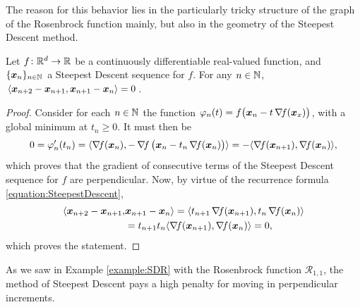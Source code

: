 \begin{example}
\begin{itemize}[nosep]
\end{itemize}
The reason for this behavior lies in the particularly tricky structure of the graph of the Rosenbrock function mainly, but also in the geometry of the Steepest Descent method.
\end{example}

\begin{theorem}
Let $f \colon \mathbb{R}^d \to \mathbb{R}$ be a continuously differentiable real-valued function, and $\{ \boldsymbol{x}_n \}_{n\in\mathbb{N}}$ a Steepest Descent sequence for $f$.  For any $n \in \mathbb{N}$, $\langle \boldsymbol{x}_{n+2} - \boldsymbol{x}_{n+1}, \boldsymbol{x}_{n+1} - \boldsymbol{x}_n \rangle = 0$.
\end{theorem}
\begin{proof}
Consider for each $n \in \mathbb{N}$ the function $\varphi_n(t) = f\big(\boldsymbol{x}_n -t \mathop{\nabla\! {f}}(\boldsymbol{x}_x)\big)$, with a global minimum at $t_n \geq 0$.  It must then be
\begin{equation*}
0 = \varphi_n'(t_n) = \langle \mathop{\nabla\! {f}}(\boldsymbol{x}_n), -\mathop{\nabla\! {f}}\big( \boldsymbol{x}_n - t_n \mathop{\nabla\! {f}}(\boldsymbol{x}_n)\big) \rangle = - \langle \mathop{\nabla\! {f}}(\boldsymbol{x}_{n+1}), \mathop{\nabla\! {f}}(\boldsymbol{x}_n) \rangle,
\end{equation*}
which proves that the gradient of consecutive terms of the Steepest Descent sequence for $f$ are perpendicular.  Now, by virtue of the recurrence formula \eqref{equation:SteepestDescent},
\begin{align*}
\langle \boldsymbol{x}_{n+2} - \boldsymbol{x}_{n+1}, &\boldsymbol{x}_{n+1} - \boldsymbol{x}_n \rangle = \langle t_{n+1}\mathop{\nabla\! {f}}(\boldsymbol{x}_{n+1}), t_n \mathop{\nabla\! {f}}(\boldsymbol{x}_n) \rangle \\
&= t_{n+1}t_n \langle \mathop{\nabla\! {f}}(\boldsymbol{x}_{n+1}), \mathop{\nabla\! {f}}(\boldsymbol{x}_n) \rangle = 0, 
\end{align*}
which proves the statement.
\end{proof}

\begin{remark}
As we saw in Example \ref{example:SDR} with the Rosenbrock function $\mathcal{R}_{1,1}$, the method of Steepest Descent pays a high penalty for moving in perpendicular increments.  
\end{remark}
